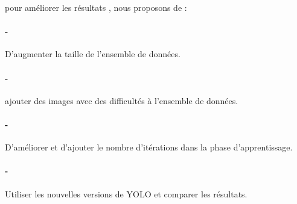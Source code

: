 pour améliorer les résultats , nous proposons de : 

\paragraph{-} D’augmenter la taille de l'ensemble de données.
\paragraph{-}ajouter des images avec des difficultés à l'ensemble de données.
\paragraph{-} D’améliorer et d'ajouter le nombre d'itérations dans la phase d’apprentissage.
\paragraph{-} Utiliser les nouvelles versions de YOLO et comparer les résultats.



